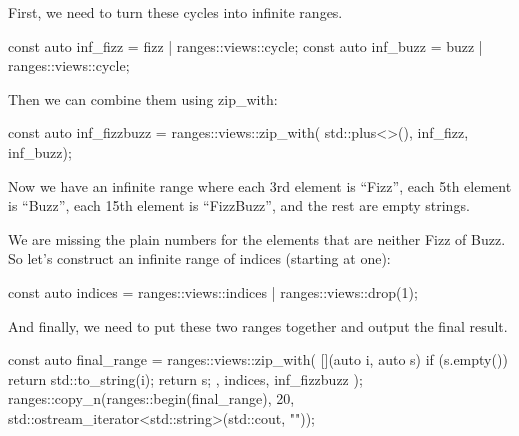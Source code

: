 First, we need to turn these cycles into infinite ranges.

\begin{box-note}
\begin{cppcode}
const auto inf_fizz = fizz | ranges::views::cycle;
const auto inf_buzz = buzz | ranges::views::cycle;
\end{cppcode}
\end{box-note}

Then we can combine them using zip\_with:

\begin{box-note}
\begin{cppcode}
const auto inf_fizzbuzz = ranges::views::zip_with(
    std::plus<>(), 
    inf_fizz, 
    inf_buzz);
\end{cppcode}
\end{box-note}

Now we have an infinite range where each 3rd element is “Fizz”, each 5th element is “Buzz”, each 15th element is “FizzBuzz”, and the rest are empty strings.

We are missing the plain numbers for the elements that are neither Fizz of Buzz. So let’s construct an infinite range of indices (starting at one):

\begin{box-note}
\begin{cppcode}
const auto indices = ranges::views::indices
    | ranges::views::drop(1);
\end{cppcode}
\end{box-note}

And finally, we need to put these two ranges together and output the final result.

\begin{box-note}
\begin{cppcode}
const auto final_range = ranges::views::zip_with(
    [](auto i, auto s) { 
        if (s.empty()) return std::to_string(i); 
        return s;
    },
    indices,
    inf_fizzbuzz
);
ranges::copy_n(ranges::begin(final_range), 20,
    std::ostream_iterator<std::string>(std::cout, "\n"));
\end{cppcode}
\end{box-note}